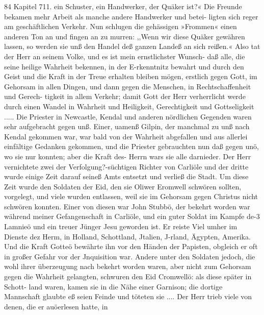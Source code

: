 84 Kapitel 711.
ein Schuster, ein Handwerker, der Quäker ist?« Die Freunde
bekamen mehr Arbeit als manche andere Handwerker und betei-
ligten sich reger am geschäftlichen Verkehr. Nun schlugen die
gehässigen »Frommen« einen anderen Ton an und fingen an zu
murren: ,,Wenn wir diese Quäker gewähren lassen, so werden sie
unß den Handel deß ganzen Landeß an sich reißen.« Also tat
der Herr an seinem Volke, und es ist mein ernstlichster Wunsch-
daß alle, die seine heilige Wahrheit bekennen, in der E-rkenntnitz
bewahrt und durch den Geist und die Kraft in der Treue erhalten
bleiben mögen, erstlich gegen Gott, im Gehorsam in allen Dingen,
und dann gegen die Menschen, in Rechtschaffenheit und Gerech-
tigkeit in allem Verkehr; damit Gott der Herr verherrlicht werde
durch einen Wandel in Wahrheit und Heiligkeit, Gerechtigkeit und
Gottseligkeit .....
Die Priester in Newcastle, Kendal und anderen nördlichen
Gegenden waren sehr aufgebracht gegen unß. Einer, uamenß
Gilpin, der manchmal zu unß nach Kendal gekommen war, war
bald von der Wahrheit abgefallen und aus allerlei einfältige
Gedanken gekommen, und die Priester gebrauchten nun daß gegen
unö, wo sie nur konnten; aber die Kraft des- Herrn wars sie
alle darnieder. Der Herr vernichtete zwei der Verfolgung?-süchtigen
Richter von Carliöle und der dritte wurde einige Zeit darauf
seineß Amts entsetzt und verließ die Stadt.
Um diese Zeit wurde den Soldaten der Eid, den sie Oliwer
Eromwell schwören sollten, vorgelegt, und viele wurden entlassen,
weil sie im Gehorsam gegen Christus nicht schwören konnten.
Einer von diesen war John Stubbö, der bekehrt worden war
während meiner Gefangenschaft in Carliöle, und ein guter Soldat
im Kampfe de-3 Lamnieö und ein treuer Jünger Jesu geworden
ist. Er reiste Viel umher im Dienste dez Herm, in Holland,
Schottland, Jtalien, J-rland, Ägypten, Amerika. Und die Kraft
Gotteö bewährte ihn vor den Händen der Papisten, obgleich er
oft in großer Gefahr vor der Jnquisition war. Andere unter
den Soldaten jedoch, die wohl ihrer überzeugung nach bekehrt
worden waren, aber nicht zum Gehorsam gegen die Wahrheit
gelangten, schwuren den Eid Cromwellö: als diese später in Schott-
land waren, kamen sie in die Nähe einer Garnison; die dortige
Mannschaft glaubte eß seien Feinde und töteten sie ....
Der Herr trieb viele von denen, die er auöerlesen hatte, in


